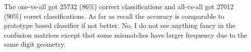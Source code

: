 \documentclass[10pt]{article}
\begin{document}
The one-vs-all got 25732 (86\%) correct classifications and all-vs-all got 27012 (90\%) corect classifications. As far as recall the accuracy is comparable to prototype based classifier if not better. No, I do not see anything fancy in the confusion matrices except that some mismatches have larger frequency due to the same digit geometry.
\end{document}
